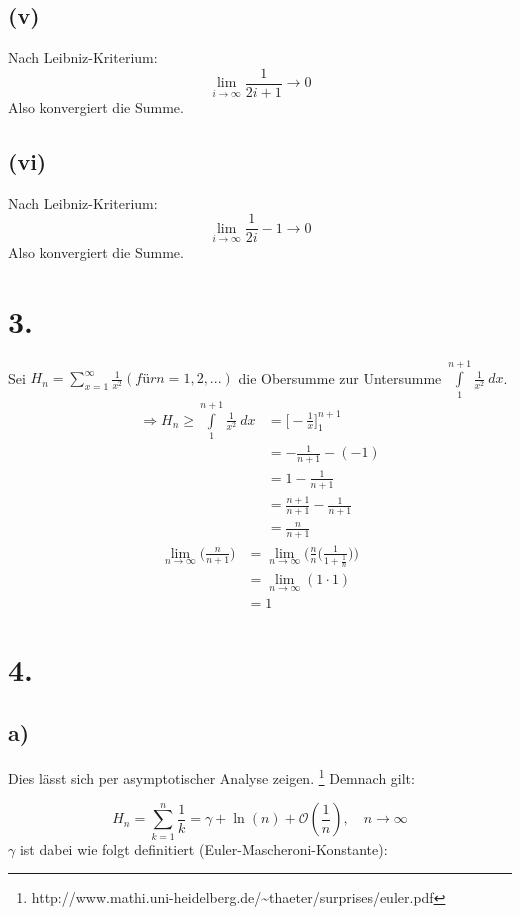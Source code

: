 \documentclass[a4paper]{scrartcl}
\begin{document}
\subsection{(v)}
Nach Leibniz-Kriterium:
\[ \lim_{i\to\infty} \frac 1 {2i+1} \rightarrow 0 \]
Also konvergiert die Summe.

\subsection{(vi)}
Nach Leibniz-Kriterium:
\[ \lim_{i\to\infty} \frac 1 {2i} - 1 \rightarrow 0 \]
Also konvergiert die Summe.

\section{3.}
Sei \(H_n = \sum\limits_{x=1}^\infty\frac{1}{x^2} (für n=1,2,...)\) die Obersumme zur Untersumme \(\int\limits_1^{n+1}\frac{1}{x^2}\ dx\).\\
\begin{align}
\Rightarrow H_n \geq \int\limits_1^{n+1}\frac{1}{x^2}\ dx &=\Big[-\frac{1}{x}\Big]_1^{n+1}\\
  &=-\frac{1}{n+1}-(-1)\\
	&=1-\frac{1}{n+1}\\
	&=\frac{n+1}{n+1}-\frac{1}{n+1}\\
	&=\frac{n}{n+1}
\end{align}
\begin{align}
\lim_{n\rightarrow\infty}\Big(\frac{n}{n+1}\Big)&=\lim_{n\rightarrow\infty}\bigg(\frac{n}{n}\Big(\frac{1}{1+\frac{1}{n}}\Big)\bigg)\\
	&=\lim_{n\rightarrow\infty}(1\cdot 1)\\
	&=1
\end{align}

\section{4.}
\subsection{a)}
Dies lässt sich per asymptotischer Analyse zeigen. \footnote{http://www.mathi.uni-heidelberg.de/\textasciitilde thaeter/surprises/euler.pdf}
Demnach gilt:

\[H_n=\sum_{k=1}^n \frac{1}{k} = \gamma + \ln (n) +\mathcal O\!\left(\frac 1{n}\right),\quad n\to\infty \]
%
\(\gamma\) ist dabei wie folgt definitiert (Euler-Mascheroni-Konstante):
\end{document}
